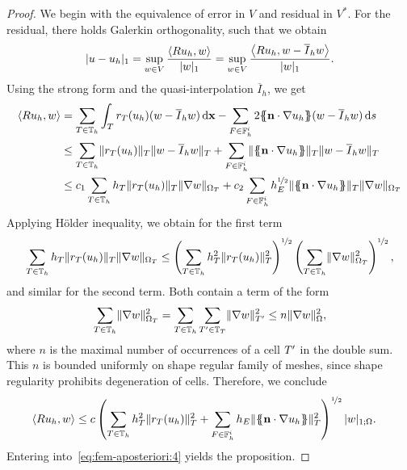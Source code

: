 \begin{proof}
  We begin with the equivalence of error in $V$ and residual in
  $V^*$. For the residual, there holds Galerkin orthogonality, such
  that we obtain
  \begin{gather}
    \label{eq:fem-aposteriori:4}
    \lvert u-u_h\rvert_1
    = \sup_{w\in V}\frac{\left<Ru_h,w\right>}{\lvert w\rvert_1}
    = \sup_{w\in V}\frac{\left<Ru_h,w- \overline I_h w\right>}{\lvert w\rvert_1}.
  \end{gather}
  Using the strong form and the quasi-interpolation $\overline I_h$,
  we get
  \begin{align*}
    \left<Ru_h,w\right>
    &= \sum_{\cell\in\mesh_h}\int_{\cell} r_\cell(u_h) (w-\overline I_h w)\dvx
    - \sum_{F\in \mathbb F_h^i} 2\mvl{\n\cdot\nabla u_h} (w-\overline I_h w)\ds
    \\
    & \le \sum_{\cell\in\mesh_h} \norm{r_\cell(u_h)}_\cell
      \norm{w-\overline I_h w}_\cell
      + \sum_{F\in \mathbb F_h^i} \norm{\mvl{\n\cdot\nabla u_h}}_\cell
      \norm{w-\overline I_h w}_\cell
      \\
    & \le c_1 \sum_{\cell\in\mesh_h} h_\cell
      \norm{r_\cell(u_h)}_\cell
      \norm{\nabla w}_{\domain_\cell}
      + c_2 \sum_{F\in \mathbb F_h^i} h_E^{\nicefrac12}
      \norm{\mvl{\n\cdot\nabla u_h}}_\cell
      \norm{\nabla w}_{\domain_\cell}
  \end{align*}
  Applying Hölder inequality, we obtain for the first term
  \begin{gather*}
    \sum_{T\in\mathbb T_h} h_T
    \lVert r_T(u_h)\rVert_T
    \lVert\nabla w\rVert_{\Omega_T}
    \le
    \left(\sum_{T\in\mathbb T_h} h_T^2
    \lVert r_T(u_h)\rVert_T^2\right)^{\nicefrac12}
  \left(\sum_{T\in\mathbb T_h} \lVert\nabla w\rVert_{\Omega_T}^2
  \right)^{\nicefrac12},
  \end{gather*}
  and similar for the second term. Both contain a term of the form
  \begin{gather*}
    \sum_{T\in\mathbb T_h} \lVert\nabla w\rVert_{\Omega_T}^2
    = \sum_{T\in\mathbb T_h} \sum_{T'\in\mathbb T_T}\lVert\nabla w\rVert_{T'}^2
    \le n \lVert\nabla w\rVert_{\Omega}^2,
  \end{gather*}
  where $n$ is the maximal number of occurrences of a cell $T'$ in
  the double sum. This $n$ is bounded uniformly on shape regular
  family of meshes, since shape regularity prohibits degeneration of
  cells. Therefore, we conclude
  \begin{align*}
    \left<Ru_h,w\right>
    & \le c \left(\sum_{T\in\mathbb T_h} h_T^2
      \lVert r_T(u_h)\rVert_T^2 +
      \sum_{F\in \mathbb F_h^i} h_E
      \lVert\{\!\!\{\mathbf n\cdot\nabla u_h\}\!\!\}\rVert_T^2\right)^{\nicefrac12}
      \lvert w\rvert_{1;\Omega}.
  \end{align*}
  Entering into~\eqref{eq:fem-aposteriori:4} yields the proposition.
\end{proof}

